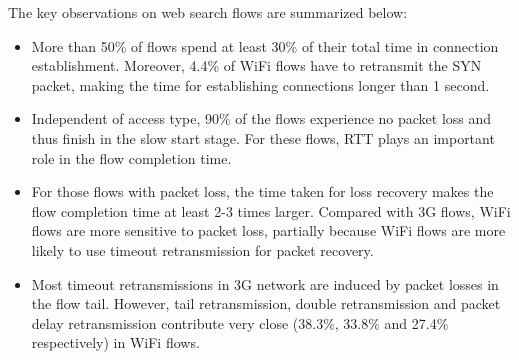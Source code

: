 The key observations on web search flows are summarized below:



\begin{itemize}
\item More than 50\% of flows spend at least 30\% of their total time in connection establishment. Moreover, 4.4\% of WiFi flows have to retransmit the SYN packet, making the time for establishing connections longer than 1 second.
	
\item Independent of access type, 90\% of the flows experience no packet loss and thus finish in the slow start stage. For these flows,  RTT plays an important role in the flow completion time. %
	
\item For those flows with packet loss, the time taken for loss recovery makes the flow completion time at least 2-3 times larger. Compared with 3G flows, WiFi flows are more sensitive to packet loss, partially because WiFi flows are more likely to use timeout retransmission for packet recovery. 
	
\item Most timeout retransmissions in 3G network are induced by packet losses in the flow tail. However, tail retransmission, double retransmission and packet delay retransmission contribute very close (38.3\%, 33.8\% and 27.4\% respectively) in WiFi flows. 
	
\end{itemize}
